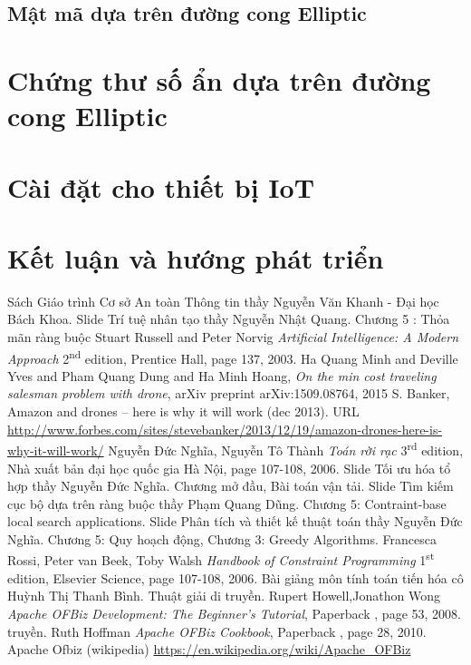 \documentclass[a4paper,12pt]{report}
\begin{document}
\section{Mật mã dựa trên đường cong Elliptic}
\chapter{Chứng thư số ẩn dựa trên đường cong Elliptic}
\chapter{Cài đặt cho thiết bị IoT}
\chapter*{Kết luận và hướng phát triển}
\begin{thebibliography}{9}
 Sách Giáo trình Cơ sở An toàn Thông tin thầy Nguyễn Văn Khanh - Đại học Bách Khoa.
 Slide Trí tuệ nhân tạo thầy Nguyễn Nhật Quang. Chương 5 : Thỏa mãn ràng buộc
 Stuart Russell and Peter Norvig 
\textit{Artificial Intelligence: A Modern Approach} 2\textsuperscript{nd } edition, Prentice Hall, page 137,  2003.
 Ha Quang Minh and Deville Yves and Pham Quang Dung and Ha Minh Hoang, \textit{On the min cost traveling salesman problem with drone}, arXiv preprint arXiv:1509.08764, 2015
 S. Banker, Amazon and drones – here is why it will work (dec 2013).
URL \url{http://www.forbes.com/sites/stevebanker/2013/12/19/amazon-drones-here-is-why-it-will-work/}
 Nguyễn Đức Nghĩa, Nguyễn Tô Thành 
\textit{Toán rời rạc} 3\textsuperscript{rd} edition, Nhà xuất bản đại học quốc gia Hà Nội, page 107-108,  2006.
 Slide Tối ưu hóa tổ hợp thầy Nguyễn Đức Nghĩa. Chương mở đầu, Bài toán vận tải.
 Slide Tìm kiếm cục bộ dựa trên ràng buộc thầy Phạm Quang Dũng. Chương 5: Contraint-base local search applications.
 Slide Phân tích và thiết kế thuật toán thầy Nguyễn Đức Nghĩa. Chương 5: Quy hoạch động, Chương 3: Greedy Algorithms.
 Francesca Rossi, Peter van Beek, Toby Walsh 
\textit{Handbook of Constraint Programming} 1\textsuperscript{st} edition, Elsevier Science, page 107-108,  2006.
 Bài giảng môn tính toán tiến hóa cô Huỳnh Thị Thanh Bình. Thuật giải di truyền.
Rupert Howell,Jonathon Wong
\textit{Apache OFBiz Development: The Beginner's Tutorial}, Paperback , page 53,  2008.
truyền.
 Ruth Hoffman
\textit{Apache OFBiz Cookbook}, Paperback , page 28, 2010.
 Apache Ofbiz (wikipedia)
\url{https://en.wikipedia.org/wiki/Apache_OFBiz}
\end{thebibliography}
\end{document}
